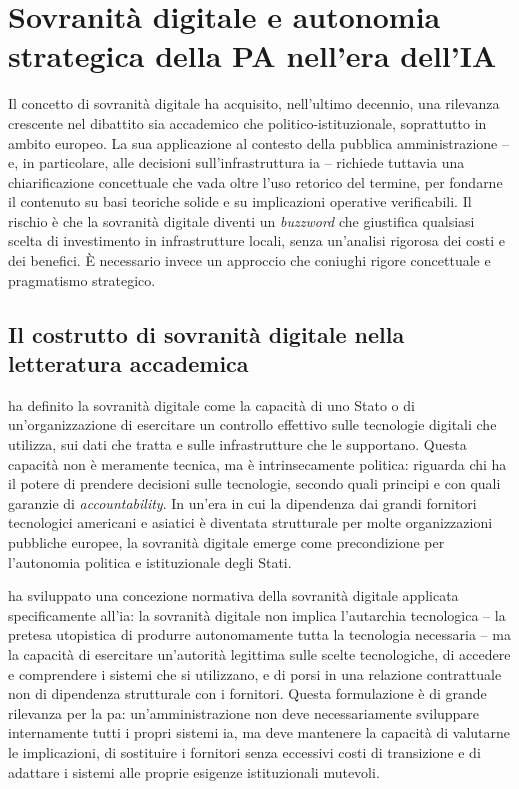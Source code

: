 \section{Sovranità digitale e autonomia strategica della PA nell'era dell'IA}
\label{sec:cap2-sovranita}

Il concetto di sovranità digitale ha acquisito, nell'ultimo decennio, una rilevanza crescente nel dibattito sia accademico che politico-istituzionale, soprattutto in ambito europeo. La sua applicazione al contesto della pubblica amministrazione -- e, in particolare, alle decisioni sull'infrastruttura \gls{ia} -- richiede tuttavia una chiarificazione concettuale che vada oltre l'uso retorico del termine, per fondarne il contenuto su basi teoriche solide e su implicazioni operative verificabili. Il rischio è che la sovranità digitale diventi un \textit{buzzword} che giustifica qualsiasi scelta di investimento in infrastrutture locali, senza un'analisi rigorosa dei costi e dei benefici. È necessario invece un approccio che coniughi rigore concettuale e pragmatismo strategico.

\subsection{Il costrutto di sovranità digitale nella letteratura accademica}

\textcite{Floridi2020} ha definito la sovranità digitale come la capacità di uno Stato o di un'organizzazione di esercitare un controllo effettivo sulle tecnologie digitali che utilizza, sui dati che tratta e sulle infrastrutture che le supportano. Questa capacità non è meramente tecnica, ma è intrinsecamente politica: riguarda chi ha il potere di prendere decisioni sulle tecnologie, secondo quali principi e con quali garanzie di \textit{accountability}. In un'era in cui la dipendenza dai grandi fornitori tecnologici americani e asiatici è diventata strutturale per molte organizzazioni pubbliche europee, la sovranità digitale emerge come precondizione per l'autonomia politica e istituzionale degli Stati.

\textcite{Roberts2024} ha sviluppato una concezione normativa della sovranità digitale applicata specificamente all'\gls{ia}: la sovranità digitale non implica l'autarchia tecnologica -- la pretesa utopistica di produrre autonomamente tutta la tecnologia necessaria -- ma la capacità di esercitare un'autorità legittima sulle scelte tecnologiche, di accedere e comprendere i sistemi che si utilizzano, e di porsi in una relazione contrattuale non di dipendenza strutturale con i fornitori. Questa formulazione è di grande rilevanza per la \gls{pa}: un'amministrazione non deve necessariamente sviluppare internamente tutti i propri sistemi \gls{ia}, ma deve mantenere la capacità di valutarne le implicazioni, di sostituire i fornitori senza eccessivi costi di transizione e di adattare i sistemi alle proprie esigenze istituzionali mutevoli.

